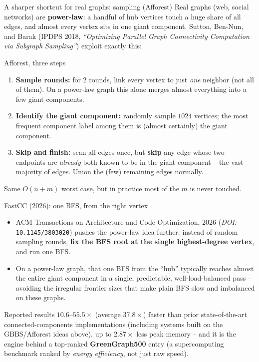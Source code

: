 \documentclass[11pt,aspectratio=169]{beamer}
\begin{document}
\begin{frame}{A sharper shortcut for real graphs: sampling (Afforest)}
  Real graphs (web, social networks) are \textbf{power-law}: a handful of hub vertices
  touch a huge share of all edges, and almost every vertex sits in one giant component.
  Sutton, Ben-Nun, and Barak (IPDPS 2018, \emph{``Optimizing Parallel Graph
  Connectivity Computation via Subgraph Sampling''}) exploit exactly this:
  \begin{block}{Afforest, three steps}
    \begin{enumerate}
      \item \textbf{Sample rounds:} for $2$ rounds, link every vertex to just
      \emph{one} neighbor (not all of them). On a power-law graph this alone merges
      almost everything into a few giant components.
      \item \textbf{Identify the giant component:} randomly sample $1024$ vertices;
      the most frequent component label among them is (almost certainly) the giant
      component.
      \item \textbf{Skip and finish:} scan all edges once, but \textbf{skip} any edge
      whose two endpoints are \emph{already} both known to be in the giant component --
      the vast majority of edges. Union the (few) remaining edges normally.
    \end{enumerate}
  \end{block}
  Same $O(n+m)$ worst case, but in practice most of the $m$ is never touched.
\end{frame}

\begin{frame}{FastCC (2026): one BFS, from the right vertex}
  \begin{itemize}
    \item ACM Transactions on Architecture and Code Optimization, 2026
    (\emph{DOI:} \texttt{10.1145/3803020}) pushes the power-law idea further:
    instead of random sampling rounds, \textbf{fix the BFS root at the single
    highest-degree vertex}, and run one BFS.
    \item On a power-law graph, that one BFS from the ``hub'' typically reaches
    almost the entire giant component in a single, predictable, well-load-balanced
    pass -- avoiding the irregular frontier sizes that make plain BFS slow and
    imbalanced on these graphs.
  \end{itemize}
  \begin{exampleblock}{Reported results}
    $10.6$--$55.5\times$ (average $37.8\times$) faster than prior state-of-the-art
    connected-components implementations (including systems built on the GBBS/Afforest
    ideas above), up to $2.87\times$ less peak memory -- and it is the engine behind a
    top-ranked \textbf{GreenGraph500} entry (a supercomputing benchmark ranked by
    \emph{energy efficiency}, not just raw speed).
  \end{exampleblock}
\end{frame}
\end{document}
